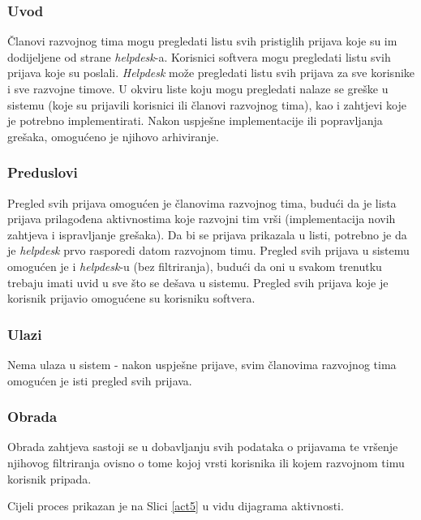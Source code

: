 \documentclass[12pt,a4paper]{article}
\begin{document}
\subsubsection{Uvod}

Članovi razvojnog tima mogu pregledati listu svih pristiglih prijava koje su im dodijeljene od strane \textit{helpdesk}-a. Korisnici softvera mogu pregledati listu svih prijava koje su poslali. \textit{Helpdesk} može pregledati listu svih prijava za sve korisnike i sve razvojne timove. U okviru liste koju mogu pregledati nalaze se greške u sistemu (koje su prijavili korisnici ili članovi razvojnog tima), kao i zahtjevi koje je potrebno implementirati. Nakon uspješne implementacije ili popravljanja grešaka, omogućeno je njihovo arhiviranje.

\subsubsection{Preduslovi}

Pregled svih prijava omogućen je članovima razvojnog tima, budući da je lista prijava prilagođena aktivnostima koje razvojni tim vrši (implementacija novih zahtjeva i ispravljanje grešaka). Da bi se prijava prikazala u listi, potrebno je da je \textit{helpdesk} prvo rasporedi datom razvojnom timu. Pregled svih prijava u sistemu omogućen je i \textit{helpdesk}-u (bez filtriranja), budući da oni u svakom trenutku trebaju imati uvid u sve što se dešava u sistemu. Pregled svih prijava koje je korisnik prijavio omogućene su korisniku softvera.

\subsubsection{Ulazi}

Nema ulaza u sistem - nakon uspješne prijave, svim članovima razvojnog tima omogućen je isti pregled svih prijava.

\subsubsection{Obrada}

Obrada zahtjeva sastoji se u dobavljanju svih podataka o prijavama te vršenje njihovog filtriranja ovisno o tome kojoj vrsti korisnika ili kojem razvojnom timu korisnik pripada.

Cijeli proces prikazan je na Slici \ref{act5} u vidu dijagrama aktivnosti.
\end{document}
